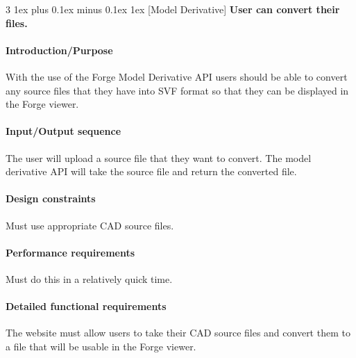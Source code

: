 \documentclass[letterpaper, 10pt, draftclsnofoot, compsoc, onecolumn]{IEEEtran}
\makeatletter
\def\subsubsection{\@startsection{subsubsection}%
                                 {3}%
                                 {\z@}%
                                 {1ex plus 0.1ex minus 0.1ex}%
                                 {1ex}%
                                 {\normalfont\normalsize}}%
\makeatother
\begin{document}

\subsubsection[{Model Derivative}]{\rmfamily\bfseries\color{black} \rmfamily\bfseries\color{black}  
	User can convert their files.
}
\smallskip

\paragraph[Introduction/Purpose of this
feature]{\rmfamily\bfseries\color{black}
Introduction/Purpose }
	With the use of the Forge Model Derivative API users should be able to convert any source files that they have into SVF format
	so that they can be displayed in the Forge viewer.

\paragraph[Input/Output sequence]{\rmfamily\bfseries\color{black}
Input/Output sequence }
	The user will upload a source file that they want to convert. The model derivative API will take the source file and return the 
	converted file.

\paragraph[Design constraints]{\rmfamily\bfseries\color{black} Design
constraints }
	Must use appropriate CAD source files. 

\paragraph[Performance requirements]{\rmfamily\bfseries\color{black}
Performance requirements }
	Must do this in a relatively quick time.

\paragraph[Detailed functional requirements]{\rmfamily\bfseries\color{black}
Detailed functional requirements }
	The website must allow users to take their CAD source files and convert them to a file that will be usable in the
	Forge viewer.    

\end{document}
